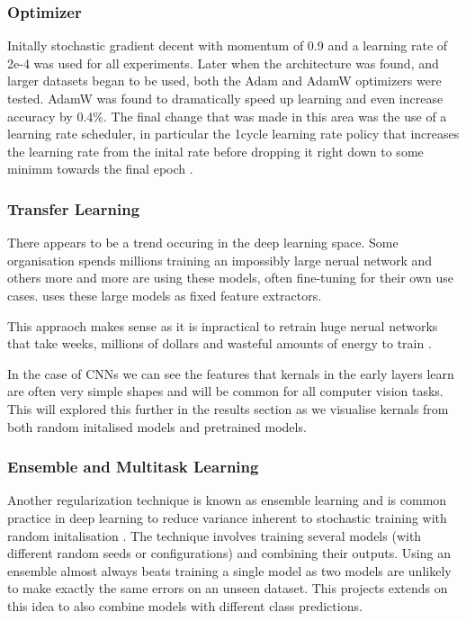 \subsubsection{Optimizer}
Initally stochastic gradient decent with momentum of 0.9 and a learning rate of 2e-4 was used for all experiments.  Later when the architecture 
was found, and larger datasets began to be used, both the Adam and AdamW optimizers were tested.  
AdamW was found to dramatically speed up learning and even increase 
accuracy by 0.4\%.  The final change that was made in this area was the use of a learning rate scheduler, in particular the 1cycle learning rate policy that 
increases the learning rate from the inital rate before dropping it right down to some minimm towards the final epoch \cite{smith2019super}.

\subsubsection{Transfer Learning}
There appears to be a trend occuring in the deep learning space.  Some organisation spends millions training an impossibly large nerual network
and others more and more are using these models, often fine-tuning for their own use cases.  \cite{} uses these large models as fixed feature extractors.

This appraoch makes sense as it is inpractical to retrain huge nerual networks that take weeks, millions of dollars and wasteful amounts of energy
to train \cite{}.

In the case of CNNs we can see the features that kernals in the early layers learn \cite{} are often very simple shapes and will be common for all
computer vision tasks.  This will explored this further in the results section as we visualise kernals from both random initalised models and 
pretrained models.

\subsubsection{Ensemble and Multitask Learning}
Another regularization technique is known as ensemble learning and is common practice in deep learning to reduce variance inherent to stochastic training 
with random initalisation \cite{deeplearningbook}.  The technique involves training several models (with different random seeds or configurations) and 
combining their outputs. Using an ensemble almost always beats training a single model as two models are unlikely to make exactly the same errors on an unseen dataset.
This projects extends on this idea to also combine models with different class predictions.

